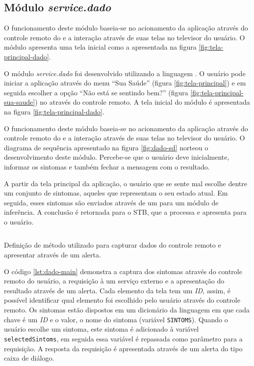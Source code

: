 \subsection{Módulo \textit{service.dado}}\label{subsubsec:dado}

O funcionamento deste módulo baseia-se no acionamento da aplicação através
do controle remoto do \stb[] e a interação através de suas telas no televisor
do usuário. O módulo apresenta uma tela inicial como a apresentada na 
figura \vref{fig:tela-principal-dado}.

O módulo \textit{service.dado} foi desenvolvido utilizando a linguagem
\python[]. O usuário pode iniciar a aplicação através do menu ``Sua Saúde''
(figura \vref{fig:tela-principal}) e em seguida escolher a opção ``Não está se
sentindo bem?'' (figura \vref{fig:tela-principal-sua-saude}) no \stb[] através
do controle remoto. A tela inicial do módulo é  apresentada na figura
\vref{fig:tela-principal-dado}.

O funcionamento deste módulo baseia-se no acionamento da aplicação através
do controle remoto do \stb[] e a interação através de suas telas no televisor
do usuário. O diagrama de sequência apresentado na figura \ref{fig:dado-sd} norteou
o desenvolvimento deste módulo. Percebe-se que o usuário deve inicialmente,
informar os sintomas e também fechar a mensagem com o resultado.


A partir da tela principal da aplicação, o usuário que se sente mal escolhe 
dentre um conjunto de sintomas, aqueles que representam o seu estado atual. Em
seguida, esses sintomas são enviados através de um \webservice[] para um
módulo de inferência. A conclusão é retornada para o STB, que a processa e 
apresenta para o usuário.

\begin{listing}[ht!]
\inputminted{python}{codigos/dado-main.py}
\caption{Definição de método utilizado para capturar dados do controle remoto
e apresentar através de um alerta.}
\label{lst:dado-main}
\end{listing}

O código \ref{lst:dado-main} demonstra a captura dos sintomas através do
controle remoto do usuário, a requisição à um serviço externo e a apresentação
do resultado através de um alerta. Cada elemento da tela tem um \textit{ID},
assim, é possível identificar qual elemento foi escolhido pelo usuário através
do controle remoto.  Os sintomas estão dispostos em um dicionário da linguagem
\python[] em que cada chave é um \textit{ID} e o valor, o nome do sintoma
(variável \texttt{SINTOMS}). Quando o usuário escolhe um sintoma, este sintoma
é adicionado à variável \texttt{selectedSintoms}, em seguida essa variável é
repassada como parâmetro para a requisição. A resposta da requisição é apresentada
através de um alerta do tipo caixa de diálogo.

